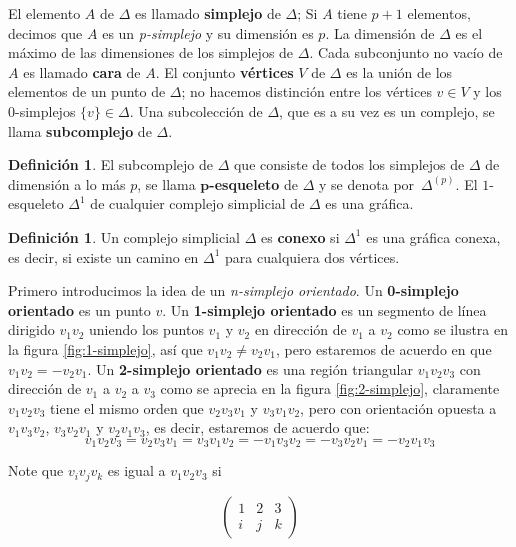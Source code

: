 \documentclass[12pt]{book}
\theoremstyle{definition}
\newtheorem{definition}[theorem]{Definición}
\newcounter{in}
\newcounter{ini}
\begin{document}
El elemento $A$ de $\Delta$ es llamado \textbf{simplejo} de
$\Delta$; Si $A$ tiene $p+1$ elementos, decimos que $A$ es un
\emph{p-simplejo} y su dimensión es $p$. La dimensión de $\Delta$
es el máximo de las dimensiones de los simplejos de $\Delta$. Cada
subconjunto no vacío de $A$ es llamado \textbf{cara} de $A$. El
conjunto \textbf{vértices} $V$ de $\Delta$ es la unión de los
elementos de un punto de $\Delta$; no hacemos distinción entre los
vértices $v\in V$ y los $0$-simplejos $\{v\}\in \Delta$. Una
subcolección de $\Delta$, que es a su vez es un complejo, se llama
\textbf{subcomplejo} de $\Delta$.

\begin{definition}
  El subcomplejo de $\Delta$ que consiste de todos los simplejos de
  $\Delta$ de dimensión a lo más $p$, se llama \textbf{$\boldsymbol{p}$-esqueleto} de
  $\Delta$ y se denota por~$\Delta^{(p)}$. El $1$-esqueleto
  $\Delta^{1}$ de cualquier complejo simplicial de $\Delta$ es una
  gráfica.
\end{definition}

\begin{definition}
  Un complejo simplicial $\Delta$ es \textbf{conexo} si
  $\Delta^{1}$ es una gráfica conexa, es decir, si existe un camino en
  $\Delta^{1}$  para cualquiera dos vértices.
\end{definition}

Primero introducimos la idea de un \emph{n-simplejo orientado}. Un
\textbf{0-simplejo orientado} es un punto $v$. Un \textbf{1-simplejo
  orientado} es un segmento de línea dirigido $v_{1}v_{2}$ uniendo los
puntos $v_{1}$ y $v_{2}$ en dirección de $v_{1}$ a $v_{2}$ como se
ilustra en la figura \ref{fig:1-simplejo}, así que
$v_{1}v_{2}\neq v_{2}v_{1}$, pero estaremos de acuerdo en que
$v_{1}v_{2}=-v_{2}v_{1}$. Un \textbf{2-simplejo orientado} es una
región triangular $v_{1}v_{2}v_{3}$ con dirección de $v_{1}$ a $v_{2}$
a $v_{3}$ como se aprecia en la figura \ref{fig:2-simplejo}, claramente $v_{1}v_{2}v_{3}$ tiene el mismo orden que
$v_{2}v_{3}v_{1}$ y $v_{3}v_{1}v_{2}$, pero con orientación opuesta a
$v_{1}v_{3}v_{2}$, $v_{3}v_{2}v_{1}$ y $v_{2}v_{1}v_{3}$, es decir, estaremos de acuerdo que:
$$v_{1}v_{2}v_{3}=v_{2}v_{3}v_{1}=v_{3}v_{1}v_{2}=-v_{1}v_{3}v_{2}=-v_{3}v_{2}v_{1}=-v_{2}v_{1}v_{3}$$

Note que $v_{i}v_{j}v_{k}$ es igual a $v_{1}v_{2}v_{3}$ si

\[ \left(
  \begin{array}{ccc}
    1 & 2 & 3 \\
    i & j & k 
  \end{array} 
\right)\] 
\end{document}
